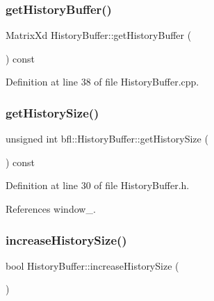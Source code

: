 \subsubsection{\texorpdfstring{get\+History\+Buffer()}{getHistoryBuffer()}}
{\footnotesize\ttfamily Matrix\+Xd History\+Buffer\+::get\+History\+Buffer (\begin{DoxyParamCaption}{ }\end{DoxyParamCaption}) const}



Definition at line 38 of file History\+Buffer.\+cpp.

\mbox{\label{classbfl_1_1HistoryBuffer_a0fef292d6e577b8f2f7d2035927edddb}} 
\subsubsection{\texorpdfstring{get\+History\+Size()}{getHistorySize()}}
{\footnotesize\ttfamily unsigned int bfl\+::\+History\+Buffer\+::get\+History\+Size (\begin{DoxyParamCaption}{ }\end{DoxyParamCaption}) const\hspace{0.3cm}{\ttfamily [inline]}}



Definition at line 30 of file History\+Buffer.\+h.



References window\+\_\+.

\mbox{\label{classbfl_1_1HistoryBuffer_a495d4786a46ffe6da00179f412d44f93}} 
\subsubsection{\texorpdfstring{increase\+History\+Size()}{increaseHistorySize()}}
{\footnotesize\ttfamily bool History\+Buffer\+::increase\+History\+Size (\begin{DoxyParamCaption}{ }\end{DoxyParamCaption})}



